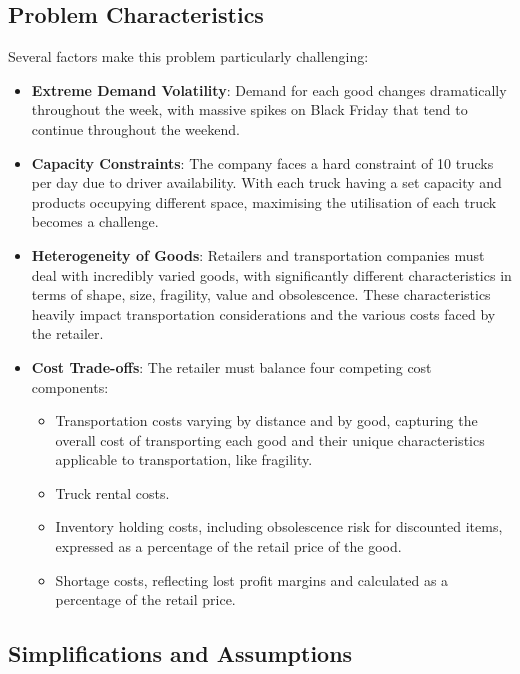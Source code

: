 \documentclass[a4paper,12pt]{article}
\begin{document}
\subsection{Problem Characteristics}\label{subsec:problem-characteristics}

Several factors make this problem particularly challenging:

\begin{itemize}
    \item \textbf{Extreme Demand Volatility}: Demand for each good changes dramatically throughout the week, with massive spikes on Black Friday that tend to continue throughout the weekend.
    \item \textbf{Capacity Constraints}: The company faces a hard constraint of 10 trucks per day due to driver availability.
With each truck having a set capacity and products occupying different space, maximising the utilisation of each truck becomes a challenge.
    \item \textbf{Heterogeneity of Goods}: Retailers and transportation companies must deal with incredibly varied goods, with significantly different characteristics in terms of shape, size, fragility, value and obsolescence.
These characteristics heavily impact transportation considerations and the various costs faced by the retailer.
    \item \textbf{Cost Trade-offs}: The retailer must balance four competing cost components:
    \begin{itemize}
        \item Transportation costs varying by distance and by good, capturing the overall cost of transporting each good and their unique characteristics applicable to transportation, like fragility.
        \item Truck rental costs.
        \item Inventory holding costs, including obsolescence risk for discounted items, expressed as a percentage of the retail price of the good.
        \item Shortage costs, reflecting lost profit margins and calculated as a percentage of the retail price.
    \end{itemize}
\end{itemize}

\subsection{Simplifications and Assumptions}\label{subsec:simplifications-and-assumptions}
\end{document}
